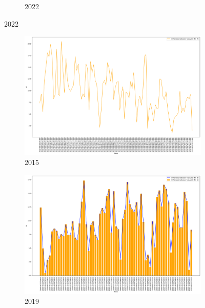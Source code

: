 \begin{figure}[h]
\begin{subfigure}{0.45\textwidth}
		\caption{2022}
	\end{subfigure}
	\label{fig:daily_dc_dif_maxmin}
\end{figure}

\begin{figure}[h]
	\centering
	\caption{Daily difference of max and min ISI values}
	\begin{subfigure}{0.45\textwidth}
		\centering
		\includegraphics[width=\textwidth]{graphs/2015/byHour/ISI_DIFFmaxMin.png}
		\caption{2015}
	\end{subfigure}
	\hfill
	\begin{subfigure}{0.45\textwidth}
		\centering
		\includegraphics[width=\textwidth]{graphs/2019/byHour/ISI_DIFFmaxMin.png}
		\caption{2019}
	\end{subfigure}
	\hfill
	\begin{subfigure}{0.45\textwidth}
		\centering

\end{subfigure}
\end{figure}
